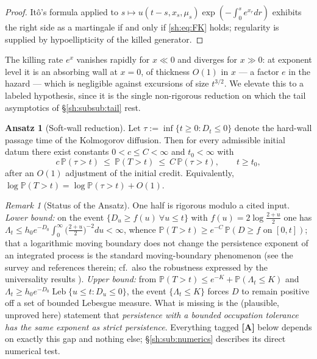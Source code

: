\documentclass[11pt]{article}
\numberwithin{equation}{section}
\theoremstyle{plain}
\theoremstyle{definition}
\newtheorem{ansatz}[theorem]{Ansatz}
\theoremstyle{remark}
\newtheorem{remark}[theorem]{Remark}
\newcommand{\PP}{\mathbb{P}}
\DeclareMathOperator{\Leb}{Leb}
\begin{document}
\begin{proof}
It\^o's formula applied to $s\mapsto
u(t-s,x_s,\mu_s)\exp(-\int_0^se^{x_r}dr)$ exhibits the right side as a
martingale if and only if \eqref{sh:eq:FK} holds; regularity is supplied by
hypoellipticity of the killed generator.
\end{proof}

The killing rate $e^x$ vanishes rapidly for $x\ll0$ and diverges for
$x\gg0$: at exponent level it is an absorbing wall at $x=0$, of thickness
$O(1)$ in $x$ --- a factor $e$ in the hazard --- which is negligible against
excursions of size $t^{3/2}$. We elevate this to a labeled hypothesis, since
it is the single non-rigorous reduction on which the tail asymptotics of
\S\ref{sh:subsub:tail} rest.

\begin{ansatz}[Soft-wall reduction]\label{sh:ansatz}
Let $\tau:=\inf\{t\ge0:D_t\le0\}$ denote the hard-wall passage time of the
Kolmogorov diffusion. Then for every admissible initial datum there exist
constants $0<c\le C<\infty$ and $t_0<\infty$ with
\[
c\,\PP(\tau>t)\ \le\ \PP(T>t)\ \le\ C\,\PP(\tau>t),\qquad t\ge t_0,
\]
after an $O(1)$ adjustment of the initial credit. Equivalently,
$\log\PP(T>t)=\log\PP(\tau>t)+O(1)$.
\end{ansatz}

\begin{remark}[Status of the Ansatz]\label{sh:rem:ansatzstatus}
One half is rigorous modulo a cited input. \emph{Lower bound:} on the event
$\{D_u\ge f(u)\ \forall u\le t\}$ with $f(u)=2\log\frac{2+u}{2}$ one has
$\Lambda_t\le h_0e^{-D_0}\int_0^\infty\bigl(\tfrac{2+u}{2}\bigr)^{-2}du<\infty$,
whence $\PP(T>t)\ge e^{-C}\,\PP(D\ge f\text{ on }[0,t])$; that a logarithmic
moving boundary does not change the persistence exponent of an integrated
process is the standard moving-boundary phenomenon (see the survey
\cite{AS15} and references therein; cf.\ also the robustness expressed
by the universality results \cite{AD13,DW15}). \emph{Upper bound:} from
$\PP(T>t)\le e^{-K}+\PP(\Lambda_t\le K)$ and
$\Lambda_t\ge h_0e^{-D_0}\Leb\{u\le t:D_u\le0\}$, the event
$\{\Lambda_t\le K\}$ forces $D$ to remain positive off a set of bounded
Lebesgue measure. What is missing is the (plausible, unproved here)
statement that \emph{persistence with a bounded occupation tolerance has the
same exponent as strict persistence}. Everything tagged \textbf{[A]} below
depends on exactly this gap and nothing else; \S\ref{sh:sub:numerics}
describes its direct numerical test.
\end{remark}
\end{document}
